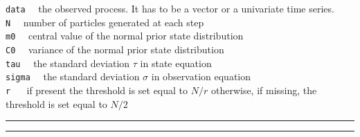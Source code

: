\documentclass[
]{book}
\theoremstyle{break}
\theoremstyle{nonumberplain}
\begin{document}
\texttt{data} ~~the observed process. It has to be a vector or a
univariate time series.\\
\texttt{N} ~~number of particles generated at each step\\
\texttt{m0} ~~central value of the normal prior state distribution\\
\texttt{C0} ~~variance of the normal prior state distribution\\
\texttt{tau} ~~the standard deviation \(\tau\) in state equation\\
\texttt{sigma} ~~the standard deviation \(\sigma\) in observation
equation\\
\texttt{r} ~~ if present the threshold is set equal to \(N/r\)
otherwise, if missing, the threshold is set equal to \(N/2\)

\hrule
\hrule
\end{document}
